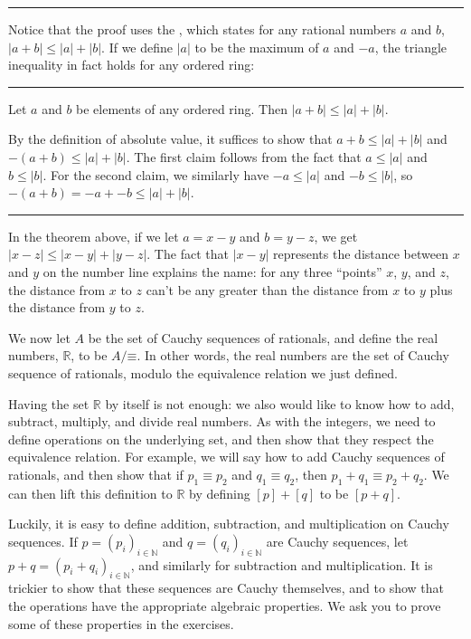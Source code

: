\documentclass[letterpaper,10pt,english]{sphinxmanual}
\begin{document}
\bigskip\hrule\bigskip


\sphinxAtStartPar
Notice that the proof uses the , which states for any rational numbers \(a\) and \(b\), \(|a + b| \leq |a| + |b|\). If we define \(|a|\) to be the maximum of \(a\) and \(-a\), the triangle inequality in fact holds for any ordered ring:


\bigskip\hrule\bigskip


\sphinxAtStartPar
{} Let \(a\) and \(b\) be elements of any ordered ring. Then \(|a + b| \leq |a| + |b|\).

\sphinxAtStartPar
{} By the definition of absolute value, it suffices to show that \(a + b \leq |a| + |b|\) and \(-(a + b) \leq |a| + |b|\). The first claim follows from the fact that \(a \leq |a|\) and \(b \leq |b|\). For the second claim, we similarly have \(-a \leq |a|\) and \(-b \leq |b|\), so \(-(a + b) = -a + - b \leq |a| + |b|\).


\bigskip\hrule\bigskip


\sphinxAtStartPar
In the theorem above, if we let \(a = x - y\) and \(b = y - z\), we get \(|x - z| \leq |x - y| + |y - z|\). The fact that \(|x - y|\) represents the distance between \(x\) and \(y\) on the number line explains the name: for any three “points” \(x\), \(y\), and \(z\), the distance from \(x\) to \(z\) can’t be any greater than the distance from \(x\) to \(y\) plus the distance from \(y\) to \(z\).

\sphinxAtStartPar
We now let \(A\) be the set of Cauchy sequences of rationals, and define the real numbers, \(\mathbb{R}\), to be \(A / \mathord{\equiv}\). In other words, the real numbers are the set of Cauchy sequence of rationals, modulo the equivalence relation we just defined.

\sphinxAtStartPar
Having the set \(\mathbb{R}\) by itself is not enough: we also would like to know how to add, subtract, multiply, and divide real numbers. As with the integers, we need to define operations on the underlying set, and then show that they respect the equivalence relation. For example, we will say how to add Cauchy sequences of rationals, and then show that if \(p_1 \equiv p_2\) and \(q_1 \equiv q_2\), then \(p_1 + q_1 \equiv p_2 + q_2\). We can then lift this definition to \(\mathbb{R}\) by defining \([p] + [q]\) to be \([p + q]\).

\sphinxAtStartPar
Luckily, it is easy to define addition, subtraction, and multiplication on Cauchy sequences. If \(p = (p_i)_{i \in \mathbb{N}}\) and \(q = (q_i)_{i \in \mathbb{N}}\) are Cauchy sequences, let \(p + q = (p_i + q_i)_{i \in \mathbb{N}}\), and similarly for subtraction and multiplication. It is trickier to show that these sequences are Cauchy themselves, and to show that the operations have the appropriate algebraic properties. We ask you to prove some of these properties in the exercises.
\end{document}
